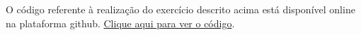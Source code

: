 \documentclass[a4paper, 11pt]{article}
\begin{document}

O código referente à realização do exercício descrito acima está disponível online na plataforma github. \href{https://github.com/lorran-araujo/LNCC/blob/main/disciplinas/redes-neurais/codes/lista2/exercicio3.ipynb}{Clique aqui para ver o código}.


 
\end{document}
